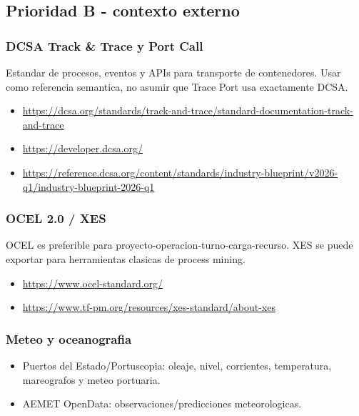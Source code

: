 \documentclass[
  spanish,
  10pt,
  a4paper,
]{article}
\providecommand{\tightlist}{%
  \setlength{\itemsep}{0pt}\setlength{\parskip}{0pt}}
\begin{document}
\subsection{Prioridad B - contexto
externo}\label{prioridad-b---contexto-externo}

\subsubsection{DCSA Track \& Trace y Port
Call}\label{dcsa-track--trace-y-port-call}

Estandar de procesos, eventos y APIs para transporte de contenedores.
Usar como referencia semantica, no asumir que Trace Port usa exactamente
DCSA.

\begin{itemize}
\tightlist
\item
  \url{https://dcsa.org/standards/track-and-trace/standard-documentation-track-and-trace}
\item
  \url{https://developer.dcsa.org/}
\item
  \url{https://reference.dcsa.org/content/standards/industry-blueprint/v2026-q1/industry-blueprint-2026-q1}
\end{itemize}

\subsubsection{OCEL 2.0 / XES}\label{ocel-20--xes}

OCEL es preferible para proyecto-operacion-turno-carga-recurso. XES se
puede exportar para herramientas clasicas de process mining.

\begin{itemize}
\tightlist
\item
  \url{https://www.ocel-standard.org/}
\item
  \url{https://www.tf-pm.org/resources/xes-standard/about-xes}
\end{itemize}

\subsubsection{Meteo y oceanografia}\label{meteo-y-oceanografia}

\begin{itemize}
\tightlist
\item
  Puertos del Estado/Portuscopia: oleaje, nivel, corrientes,
  temperatura, mareografos y meteo portuaria.
\item
  AEMET OpenData: observaciones/predicciones meteorologicas.
\end{itemize}
\end{document}
